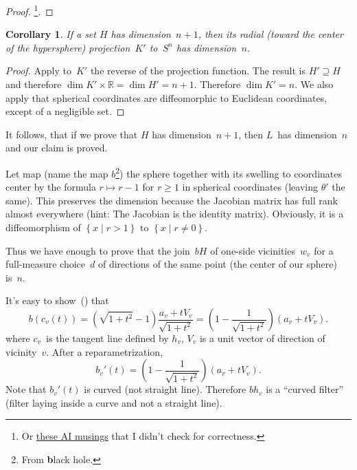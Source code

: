 \documentclass[oneside,draft]{amsart}
\newcommand{\setcond}[2]{\left\{#1\mid#2\right\}}
\newtheorem{cor}{Corollary}
\begin{document}
\begin{proof}
\cite{189275}\footnote{Or \href{https://grok.com/share/bGVnYWN5_2e0aef8b-4309-420f-815c-a09d76ae97c1}{these AI musings}
that I didn't check for correctness.}.
\end{proof}

\begin{cor}
If a set $H$ has dimension~$n+1$, then its radial (toward the center of the hypersphere) projection~$K'$ to~$S^n$ has dimension~$n$.
\end{cor}

\begin{proof}
Apply to~$K'$ the reverse of the projection function. The result is $H'\supseteq H$ and therefore $\dim K'\times\mathbb{R}=\dim H'=n+1$. Therefore $\dim K'=n$.
We also apply that spherical coordinates are diffeomorphic to Euclidean coordinates, except of a negligible set.
\end{proof}

It follows, that if we prove that $H$ has dimension~$n+1$, then $L$~has dimension~$n$ and our claim is proved.

Let map (name the map $b$\footnote{From \textbf{b}lack hole.}) the sphere together with its swelling to coordinates center by the formula $r\mapsto r-1$ for $r\geq 1$ in spherical coordinates (leaving $\theta'$ the same).
This preserves the dimension because the Jacobian matrix has full rank almost everywhere (hint: The Jacobian is the identity matrix).
Obviously, it is a diffeomorphism of $\setcond{x}{r>1}$ to $\setcond{x}{r\ne 0}$.

Thus we have enough to prove that the join~$bH$ of one-si\-de vicinities~$w_v$ for a full-me\-a\-su\-re choice~$d$ of directions of the same point (the center of our sphere) is~$n$.

It's easy to show~(\cite{curve}) that
\[ b(c_v(t)) = \left(\sqrt{1+t^2}-1\right)\frac{a_v+tV_v}{\sqrt{1+t^2}} =
\left(1-\frac{1}{\sqrt{1+t^2}}\right)(a_v+tV_v). \]
where $c_v$~is the tangent line defined by $h_v$, $V_v$ is a unit vector of direction of vicinity~$v$.
After a reparametrization, \[ b_v'(t) = \left(1-\frac{1}{\sqrt{1+t^2}}\right)(a_v+tV_v). \]
Note that $b_v'(t)$ is curved (not straight line). Therefore $bh_v$ is a ``curved filter'' (filter laying inside a curve and not a straight line).
\end{document}
